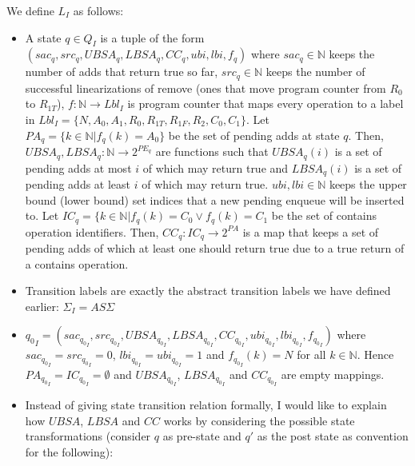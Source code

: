 We define $L_I$ as follows:
\begin{itemize}
\item A state $q \in Q_I$ is a tuple of the form $(sac_q, src_q, UBSA_q, LBSA_q, CC_q, ubi,lbi, f_q)$ where $sac_q \in \mathbb{N}$ keeps the number of adds that return true so far, $src_q \in \mathbb{N}$ keeps the number of successful linearizations of remove (ones that move program counter from $R_0$ to $R_{1T}$), $f:\mathbb{N} \rightarrow Lbl_I$ is program counter that maps every operation to a label in $Lbl_I = \{N, A_0, A_1, R_0, R_{1T}, R_{1F}, R_2, C_0, C_1\}$. Let $PA_q = \{k \in \mathbb{N}| f_q(k) = A_0\}$ be the set of pending adds at state $q$. Then, $UBSA_q, LBSA_q: \mathbb{N} \rightarrow 2^{PE_q}$ are functions such that $UBSA_q(i)$ is a set of pending adds at most $i$ of which may return true and $LBSA_q(i)$ is a set of pending adds at least $i$ of which may return true. $ubi, lbi \in \mathbb{N}$ keeps the upper bound (lower bound) set indices that a new pending enqueue will be inserted to. Let $IC_q = \{k \in \mathbb{N}| f_q(k) = C_0 \vee f_q(k) = C_1$  be the set of contains operation identifiers. Then, $CC_q: IC_q \rightarrow 2^{PA}$ is a map that keeps a set of pending adds of which at least one should return true due to a true return of a contains operation.
\item Transition labels are exactly the abstract transition labels we have defined earlier: $\Sigma_I = AS\Sigma$
\item ${q_0}_I =(sac_{{q_0}_I}, src_{{q_0}_I}, UBSA_{{q_0}_I}, LBSA_{{q_0}_I}, CC_{{q_0}_I}, ubi_{{q_0}_I}, lbi_{{q_0}_I}, f_{{q_0}_I})$ where $sac_{{q_0}_I} = src_{{q_0}_I} =  0$, $lbi_{{q_0}_I} = ubi_{{q_0}_I} = 1$ and $f_{{q_0}_I}(k) = N$ for all $k \in \mathbb{N}$. Hence $PA_{{q_0}_I} = IC_{{q_0}_I} = \emptyset$ and $UBSA_{{q_0}_I}$, $LBSA_{{q_0}_I}$ and $CC_{{q_0}_I}$ are empty mappings.
\item Instead of giving state transition relation formally, I would like to explain how $UBSA$, $LBSA$ and $CC$ works by considering the possible state transformations (consider $q$ as pre-state and $q'$ as the post state as convention for the following):
\begin{itemize}

\end{itemize}
\end{itemize}
